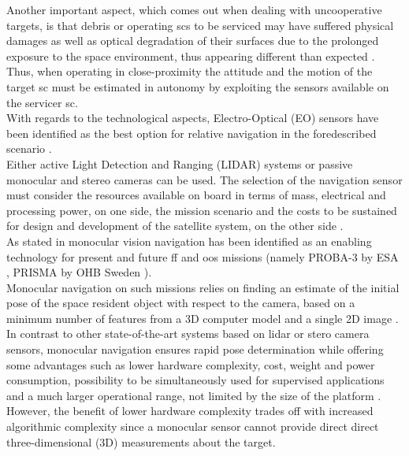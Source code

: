 Another important aspect, which comes out when dealing with uncooperative targets, is that debris or operating \acrshort{sc}s to be serviced may have suffered physical damages as well as optical degradation of their surfaces due to the prolonged exposure to the space environment, thus appearing different than expected \cite{Opromolla2017}.\\
Thus, when operating in close-proximity the attitude and the motion of the target \acrshort{sc} must be estimated in autonomy by exploiting the sensors available on the servicer \acrshort{sc}.\\
With regards to the technological aspects, Electro-Optical (EO) sensors have been identified as the best option for relative navigation in the foredescribed scenario \cite{Opromolla2017} \cite{pesciolino}.\\
Either active Light Detection and Ranging (LIDAR) systems or passive monocular and stereo cameras can be used. The selection of the navigation sensor must consider the resources available on board in terms of mass, electrical and processing power, on one side, the mission scenario and the costs to be sustained for design and development of the satellite system, on the other side \cite{clerc2012astrium} \cite{pesciolino}.\\
As stated in \cite{Sharma2016} monocular vision navigation has been identified as an enabling technology for present and future \acrshort{ff} and \acrshort{oos} missions (namely PROBA-3 by ESA \cite{Casti2019}, PRISMA by OHB Sweden \cite{2013Damico}).\\
Monocular navigation on such missions relies on finding an estimate of the initial pose of the space resident object with respect to the camera, based on a minimum number of features from a 3D computer model and a single 2D image \cite{Sharma2016}.\\
In contrast to other state-of-the-art systems based on \acrfull{lidar} or stero camera sensors, monocular navigation ensures rapid pose determination while offering some advantages such as lower hardware complexity, cost, weight and power consumption, possibility to be simultaneously used for supervised applications and a much larger operational range, not limited by the size of the platform \cite{Sharma2018} \cite{2016Ventura} \cite{pesciolino}.
However, the benefit of lower hardware complexity trades off with increased algorithmic complexity since a monocular sensor cannot provide direct
direct three-dimensional (3D) measurements about the target.\\
